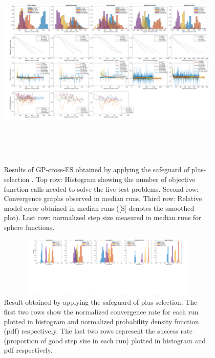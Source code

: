 \begin{center}
\begin{figure}
\includegraphics[height=4.3in, width=6.1in]{merged_plot_emergency_v4_final.pdf}
\caption{Results of GP-cross-ES obtained by applying the safeguard of plus-selection . Top row: Histogram showing the number of objective function calls needed to solve the five test problems. Second row: Convergence graphs observed in median runs. Third row: Relative model error obtained in median runs ([S] denotes the smoothed plot). Last row: normalized step size measured in median runs for sphere functions. }
\label{fig:merged_plot_GP-cross-ES}
\end{figure}
\end{center}


\begin{center}
\begin{figure}
\includegraphics[height=1.2in, width=6in]{success_emergency_v3_final.pdf}
\caption{Result obtained by applying the safeguard of plus-selection. The first two rows show the normalized convergence rate for each run plotted in histogram and normalized probability density function (pdf) respectively. The last two rows represent the success rate (proportion of good step size in each run) plotted in histogram and pdf respectively. 
}
\label{fig:success_plot_GP-cross-ES}
\end{figure}
\end{center}


